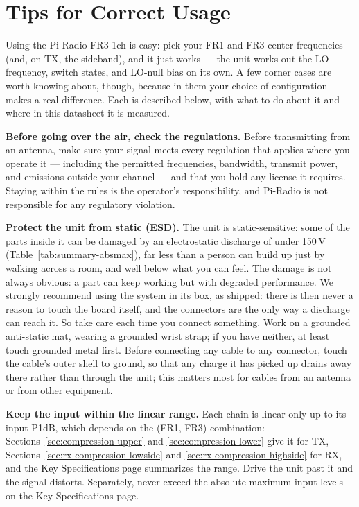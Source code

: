 \clearpage
\section{Tips for Correct Usage}
\label{sec:tips}

Using the Pi-Radio FR3-1ch is easy: pick your FR1 and FR3 center frequencies (and, on TX, the sideband), and it just
works --- the unit works out the LO frequency, switch states, and LO-null bias on its own. A few corner cases are
worth knowing about, though, because in them your choice of configuration makes a real difference. Each is
described below, with what to do about it and where in this datasheet it is measured.

\textbf{Before going over the air, check the regulations.} Before transmitting from an antenna, make sure your
signal meets every regulation that applies where you operate it --- including the permitted frequencies,
bandwidth, transmit power, and emissions outside your channel --- and that you hold any license it requires. Staying
within the rules is the operator's responsibility, and Pi-Radio is not responsible for any regulatory violation.

\textbf{Protect the unit from static (ESD).} The unit is static-sensitive: some of the parts inside it can be damaged by an
electrostatic discharge of under 150\,V (Table~\ref{tab:summary-absmax}), far less than a person can build up just
by walking across a room, and well below what you can feel. The damage is not always obvious: a part can keep working
but with degraded performance. We strongly recommend using the system in its box, as shipped: there is then never a
reason to touch the board itself, and the connectors are the only way a discharge can reach it. So take care each time
you connect something. Work on a grounded anti-static mat, wearing a grounded wrist strap; if you have neither, at
least touch grounded metal first. Before connecting any cable to any connector, touch the cable's outer shell to
ground, so that any charge it has picked up drains away there rather than through the unit; this matters most for
cables from an antenna or from other equipment.

\textbf{Keep the input within the linear range.} Each chain is linear only up to its input P1dB, which depends on
the (FR1, FR3) combination: Sections~\ref{sec:compression-upper} and \ref{sec:compression-lower} give it for TX,
Sections~\ref{sec:rx-compression-lowside} and \ref{sec:rx-compression-highside} for RX, and the Key Specifications
page summarizes the range. Drive the unit past it and the signal distorts. Separately, never exceed the absolute
maximum input levels on the Key Specifications page.

